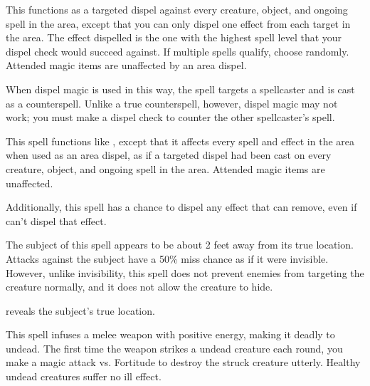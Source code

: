 \begin{spelleffect}
  \par This functions as a targeted dispel against every creature, object, and ongoing spell in the area, except that you can only dispel one effect from each target in the area. The effect dispelled is the one with the highest spell level that your dispel check would succeed against. If multiple spells qualify, choose randomly. Attended magic items are unaffected by an area dispel.

  \par {} When dispel magic is used in this way, the spell targets a spellcaster and is cast as a counterspell. Unlike a true counterspell, however, dispel magic may not work; you must make a dispel check to counter the other spellcaster's spell.
\end{spelleffect}

\begin{spelleffect}
  This spell functions like , except that it affects every spell and effect in the area when used as an area dispel, as if a targeted dispel had been cast on every creature, object, and ongoing spell in the area. Attended magic items are unaffected.
  \par Additionally, this spell has a chance to dispel any effect that  can remove, even if  can't dispel that effect.
\end{spelleffect}

\spellrng{\rngclose}
\begin{spelleffect}
  The subject of this spell appears to be about 2 feet away from its true location. Attacks against the subject have a 50\% miss chance as if it were invisible. However, unlike invisibility, this spell does not prevent enemies from targeting the creature normally, and it does not allow the creature to hide.
\end{spelleffect}
\begin{spellnotes}
     reveals the subject's true location.
\end{spellnotes}

\spellrng{\rngclose}
\spelldur{\durshort}
\begin{spelleffect}
    This spell infuses a melee weapon with positive energy, making it deadly to undead. The first time the weapon strikes a \bloodied undead creature each round, you make a magic attack vs. Fortitude to destroy the struck creature utterly. Healthy undead creatures suffer no ill effect.
\end{spelleffect}

